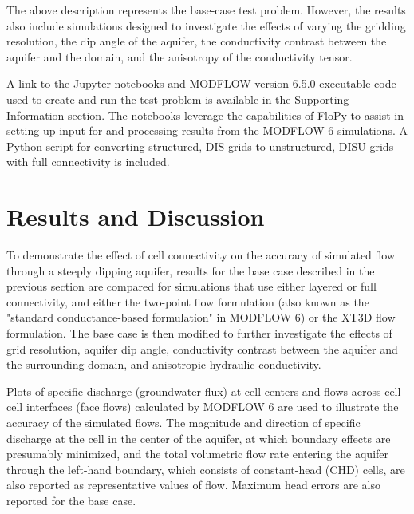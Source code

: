 \documentclass{article}
\begin{document}
The above description represents the base-case test problem. However, the results also include simulations designed to investigate the effects of varying the gridding resolution, the dip angle of the aquifer, the conductivity contrast between the aquifer and the domain, and the anisotropy of the conductivity tensor.

A link to the Jupyter notebooks and MODFLOW version 6.5.0 executable code used to create and run the test problem is available in the Supporting Information section. The notebooks leverage the capabilities of FloPy \citep{bakker2016scripting, hughes2024flopy} to assist in setting up input for and processing results from the MODFLOW 6 simulations. A Python script for converting structured, DIS grids to unstructured, DISU grids with full connectivity is included.

\section{Results and Discussion}

To demonstrate the effect of cell connectivity on the accuracy of simulated flow through a steeply dipping aquifer, results for the base case described in the previous section are compared for simulations that use either layered or full connectivity, and either the two-point flow formulation (also known as the "standard conductance-based formulation" in MODFLOW 6) or the XT3D flow formulation. The base case is then modified to further investigate the effects of grid resolution, aquifer dip angle, conductivity contrast between the aquifer and the surrounding domain, and anisotropic hydraulic conductivity.

Plots of specific discharge (groundwater flux) at cell centers and flows across cell-cell interfaces (face flows) calculated by MODFLOW 6 are used to illustrate the accuracy of the simulated flows. The magnitude and direction of specific discharge at the cell in the center of the aquifer, at which boundary effects are presumably minimized, and the total volumetric flow rate entering the aquifer through the left-hand boundary, which consists of constant-head (CHD) cells, are also reported as representative values of flow. Maximum head errors are also reported for the base case.
\end{document}
